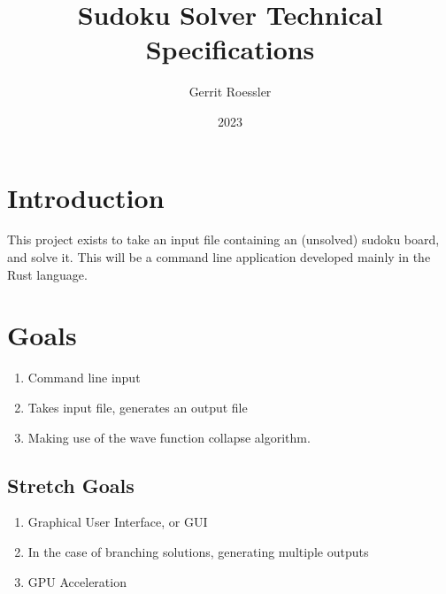 \documentclass[11pt]{article}
\author{Gerrit Roessler}
\title{Sudoku Solver Technical Specifications}
\date{2023}
\begin{document}
\maketitle
\section{Introduction}
This project exists to take an input file containing an 
(unsolved) sudoku board, and solve it. This will be a command 
line application developed mainly in the Rust language.
\section{Goals}
\begin{enumerate}
  \item Command line input
  \item Takes input file, generates an output file
  \item Making use of the wave function collapse algorithm.
\end{enumerate}
\subsection{Stretch Goals}
\begin{enumerate}
  \item Graphical User Interface, or GUI
  \item In the case of branching solutions, generating multiple outputs
  \item GPU Acceleration
\end{enumerate}
\end{document}

